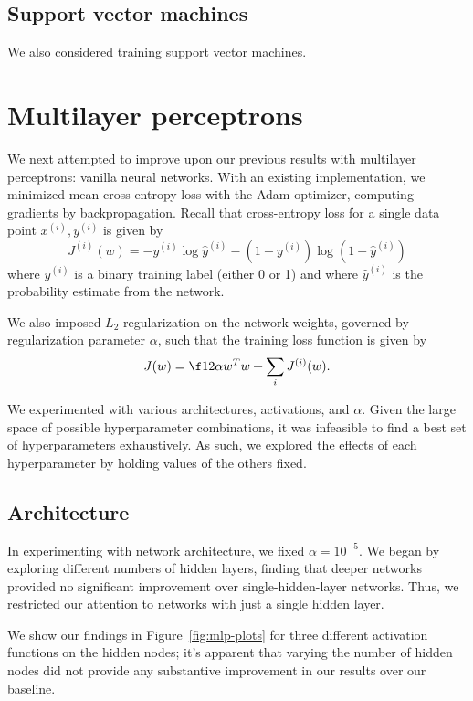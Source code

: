 \documentclass{article}
\newcommand{\sind}[1]{^{(#1)}}
\begin{document}
\begin{multicols}{2}
\subsection{Support vector machines}

We also considered training support vector machines.


\section{Multilayer perceptrons}

We next attempted to improve upon our previous results
with multilayer perceptrons:
vanilla neural networks.
With an existing implementation,
we minimized mean cross-entropy loss with the Adam optimizer,
computing gradients by backpropagation.
Recall that cross-entropy loss for a single data point $x\sind{i}, y\sind{i}$
is given by
\begin{equation}
    J\sind{i}(w) = -y\sind{i}\log\hat y\sind{i} - (1-y\sind{i})\log(1-\hat y\sind{i})
\end{equation}
where $y\sind{i}$ is a binary training label (either 0 or 1)
and where $\hat y\sind{i}$ is the probability estimate from the network.

We also imposed $L_2$ regularization on the network weights,
governed by regularization parameter $\alpha$,
such that the training loss function is given by
\begin{equation}
    J(w) = \f12\alpha w^T w + \sum_i J\sind{i}(w).
\end{equation}

We experimented with various architectures, activations, and $\alpha$.
Given the large space of possible hyperparameter combinations,
it was infeasible to find a best set of hyperparameters exhaustively.
As such,
we explored the effects of each hyperparameter
by holding values of the others fixed.

\subsection{Architecture}

In experimenting with network architecture,
we fixed $\alpha = 10^{-5}$.
We began by exploring different numbers of hidden layers,
finding that deeper networks provided no significant improvement
over single-hidden-layer networks.
Thus, we restricted our attention
to networks with just a single hidden layer.

We show our findings in Figure~\ref{fig:mlp-plots}
for three different activation functions on the hidden nodes;
it's apparent that varying the number of hidden nodes
did not provide any substantive improvement in our results
over our baseline.


\end{multicols}
\end{document}
